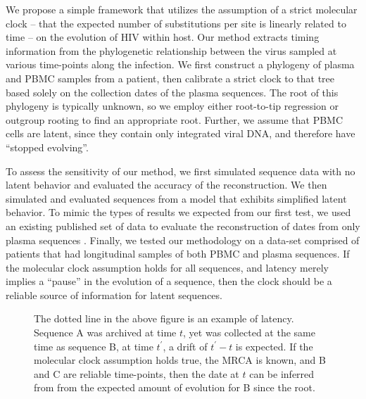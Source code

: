 We propose a simple framework that utilizes the assumption of a strict molecular clock -- that the expected number of substitutions per site is linearly related to time \citep{Ho14} --  on the evolution of HIV within host. 
Our method extracts timing information from the phylogenetic relationship between the virus sampled at various time-points along the infection. 
We first construct a phylogeny of plasma and PBMC samples from a patient, then calibrate a strict clock to that tree based solely on the collection dates of the plasma sequences. The root of this phylogeny is typically unknown, so we employ either root-to-tip regression or outgroup rooting to find an appropriate root. 
Further, we assume that PBMC cells are latent, since they contain only integrated viral DNA, and therefore have ``stopped evolving''.

To assess the sensitivity of our method, we first simulated sequence data with no latent behavior and evaluated the accuracy of the reconstruction. 
We then simulated and evaluated sequences from a model that exhibits simplified latent behavior. 
To mimic the types of results we expected from our first test, we used an existing published set of data to evaluate the reconstruction of dates from only plasma sequences \citep{McCloskey14}. 
Finally, we tested our methodology on a data-set comprised of patients that had longitudinal samples of both PBMC and plasma sequences. 
If the molecular clock assumption holds for all sequences, and latency merely implies a ``pause'' in the evolution of a sequence, then the clock should be a reliable source of information for latent sequences.

\begin{figure} \label{fig:latenttree}
	\centering
	\scalebox{5}{}
	\caption[Example of latent behavior]{The dotted line in the above figure is an example of latency. 
	Sequence A was archived at time $t$, yet was collected at the same time as sequence B, at time $t^\prime$, a drift of $t^\prime - t$ is expected. 
	If the molecular clock assumption holds true, the MRCA is known, and B and C are reliable time-points, then the date at $t$ can be inferred from from the expected amount of evolution for B since the root.}
\end{figure}
